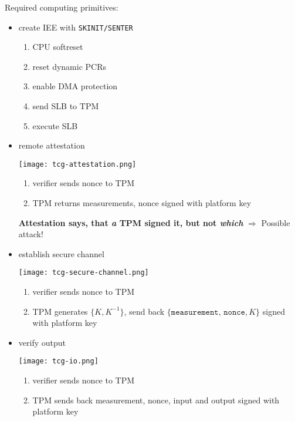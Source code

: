 Required computing primitives:
\begin{itemize}
    \item create IEE with \texttt{SKINIT/SENTER}
        \begin{enumerate}
            \item CPU softreset
            \item reset dynamic PCRs
            \item enable DMA protection
            \item send SLB to TPM
            \item execute SLB
        \end{enumerate}
    \item remote attestation
      \begin{center}
	\texttt{[image: tcg-attestation.png]}
      \end{center}
        \begin{enumerate}
            \item verifier sends nonce to TPM
            \item TPM returns measurements, nonce signed with platform key
        \end{enumerate}
	\textbf{Attestation says, that \textit{a} TPM signed it, but not
	\textit{which}} $\Rightarrow$ Possible attack!
    \item establish secure channel
      \begin{center}
	\texttt{[image: tcg-secure-channel.png]}
      \end{center}
        \begin{enumerate}
            \item verifier sends nonce to TPM
            \item TPM generates $\{K, K^{-1}\}$, send back $\{\texttt{measurement, nonce}, K\}$ signed with platform key
        \end{enumerate}
    \item verify output
      \begin{center}
	\texttt{[image: tcg-io.png]}
      \end{center}
        \begin{enumerate}
            \item verifier sends nonce to TPM
            \item TPM sends back measurement, nonce, input and output signed with platform key
        \end{enumerate}
\end{itemize}

